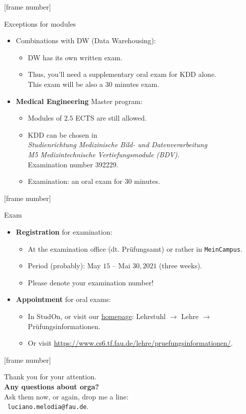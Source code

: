 \documentclass[aspectratio=169,t]{beamer}
\begin{document}
{ %
	[frame number]
	\begin{frame}{Exceptions for modules}
		\begin{itemize}
			\item Combinations with DW (Data Warehousing):
			      \begin{itemize}
				      \item DW has its own written exam.
				      \item Thus, you'll need a supplementary oral exam for KDD alone.\\
				            This exam will be also a $30$ minutes exam.
			      \end{itemize}
			\item \textbf{Medical Engineering} Master program:
			      \begin{itemize}
				      \item Modules of $2.5$ ECTS are still allowed.
				      \item KDD can be chosen in \\
				            \emph{Studienrichtung Medizinische Bild- und Datenverarbeitung \\ M5 Medizintechnische Vertiefungsmodule (BDV).}\\
				            Examination number 392229.
				      \item Examination: an oral exam for $30$ minutes.
			      \end{itemize}
		\end{itemize}
	\end{frame}
}

{ %
	[frame number]
	\begin{frame}{Exam}
		\begin{itemize}
			\item \textbf{Registration} for examination:
			      \begin{itemize}
				      \item At the examination office (dt. Prüfungsamt) or rather in \texttt{MeinCampus}.
				      \item Period (probably): May $15$ -- Mai $30, 2021$ (three weeks).
				      \item Please denote your examination number!
			      \end{itemize}
			\item \textbf{Appointment} for oral exams:
			      \begin{itemize}
				      \item In StudOn, or visit our \href{https://www.cs6.tf.fau.de/lehre/pruefungsinformationen/}{homepage}: Lehrstuhl $\rightarrow$ Lehre $\rightarrow$ Prüfungsinformationen.
				      \item Or visit \url{https://www.cs6.tf.fau.de/lehre/pruefungsinformationen/}.
			      \end{itemize}
		\end{itemize}
	\end{frame}
}

{ %
	[frame number]
	\begin{frame}[c]
		\begin{center}
			Thank you for your attention.\\
			{\bf Any questions about orga?}\\[0.5cm]
			Ask them now, or again, drop me a line: \\
			\faSendO \ \texttt{luciano.melodia@fau.de}.
		\end{center}
	\end{frame}
}
\end{document}
